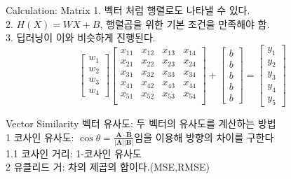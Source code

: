 \documentclass{beamer}
\begin{document}
\begin{frame}{Calculation: Matrix}
    1. 벡터 처럼 행렬로도 나타낼 수 있다.\\
    2. $H(X)=WX+B$, 행렬곱을 위한 기본 조건을 만족해야 함.\\
    3. 딥러닝이 이와 비슷하게 진행된다.
    \begin{equation*}
        \begin{bmatrix}
        w_1 \\ 
        w_2 \\ 
        w_3 \\ 
        w_4
        \end{bmatrix}
        \begin{bmatrix}
        x_{11} & x_{12} & x_{13} & x_{14} \\
        x_{21} & x_{22} & x_{23} & x_{24}\\
        x_{31} & x_{32} & x_{33} & x_{34}\\
        x_{41} & x_{42} & x_{43} & x_{44}\\
        x_{51} & x_{52} & x_{53} & x_{54}\\

        \end{bmatrix}
        + 
        \begin{bmatrix}
        b \\ 
        b \\ 
        b \\ 
        b \\ 
        b
        \end{bmatrix}
        =
        \begin{bmatrix}
        y_1 \\ 
        y_2 \\ 
        y_3 \\ 
        y_4 \\ 
        y_5
        \end{bmatrix}
    \end{equation*}
\end{frame}
\begin{frame}{Vector Similarity}
    벡터 유사도: 두 벡터의 유사도를 계산하는 방법\\
    1 코사인 유사도: $\cos \theta=\frac{\mathbf{A}\cdot\mathbf{B}}{\vert\mathbf{A}\vert\vert\mathbf{B}\vert}$임을 이용해 방향의 차이를 구한다\\
    1.1 코사인 거리: 1-코사인 유사도\\
    2 유클리드 거: 차의 제곱의 합이다.(MSE,RMSE)
\end{frame}
\end{document}
